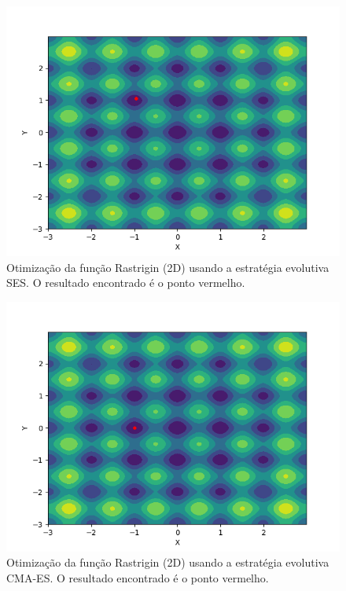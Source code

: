 \documentclass[conference]{IEEEtran}
\begin{document}
\begin{figure}[htbp]
\centering
\centerline{\includegraphics[scale=0.5]{imagens/rastrigin/ses.png}}
\caption{Otimização da função Rastrigin (2D) usando a estratégia evolutiva SES. O resultado encontrado é o ponto vermelho.}
\label{rastrigin/ses}
\end{figure} 

\begin{figure}[htbp]
\centering
\centerline{\includegraphics[scale=0.5]{imagens/rastrigin/cmaes.png}}
\caption{Otimização da função Rastrigin (2D) usando a estratégia evolutiva CMA-ES. O resultado encontrado é o ponto vermelho.}
\label{rastrigin/cmaes}
\end{figure}
\end{document}
